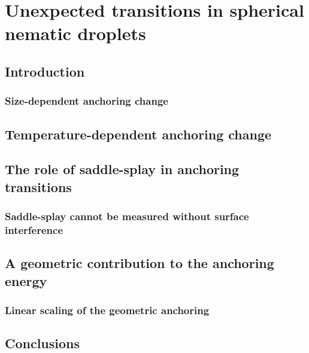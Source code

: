\chapter{Unexpected transitions in spherical nematic droplets}

\section{Introduction}
\subsection{Size-dependent anchoring change}

\section{Temperature-dependent anchoring change}

\section{The role of saddle-splay in anchoring transitions}
\subsection{Saddle-splay cannot be measured without surface interference}

\section{A geometric contribution to the anchoring energy}
\subsection{Linear scaling of the geometric anchoring}

\section{Conclusions}
